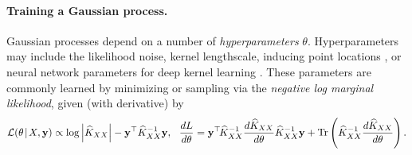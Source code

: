 \paragraph{Training a Gaussian process.}
Gaussian processes depend on a number of \emph{hyperparameters} $\theta$.
Hyperparameters may include the likelihood noise, kernel lengthscale, inducing point locations \cite{titsias2009variational}, or neural network parameters for deep kernel learning \cite{wilson2016deep}.
These parameters are commonly learned by minimizing or sampling via the \emph{negative log marginal likelihood}, given (with derivative) by
%
\begin{equation}
  \loglik (\theta \! \mid \! \bX, \by) \propto \log \left\vert \trainK \right\vert - \by^{\top}\trainK^{-1}\by,
  \:\:\:
  \frac{dL}{d\theta} = \by^{\top} \! \trainK^{-1}\frac{d\trainK}{d\theta}\trainK^{-1}\by + \tr{\trainK^{-1}\frac{d\trainK}{d\theta}} \label{eq:log_lik_and_deriv}.
\end{equation}
